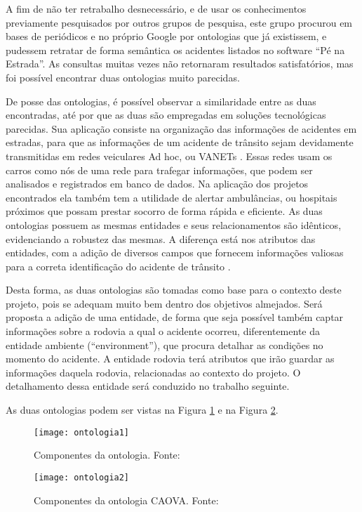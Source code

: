 
  A fim de não ter retrabalho desnecessário, e de usar os conhecimentos previamente
  pesquisados por outros grupos de pesquisa, este grupo procurou em bases de periódicos e no
  próprio Google por ontologias que já existissem, e pudessem retratar de forma semântica os
  acidentes listados no software “Pé na Estrada”. As consultas muitas vezes não retornaram
  resultados satisfatórios, mas foi possível encontrar duas ontologias muito parecidas.
  
  De posse das ontologias, é possível observar a similaridade entre as duas encontradas,
  até por que as duas são empregadas em soluções tecnológicas parecidas. Sua aplicação
  consiste na organização das informações de acidentes em estradas, para que as informações de
  um acidente de trânsito sejam devidamente transmitidas em redes veiculares Ad hoc, ou
  VANETs \cite{barrachina12}. Essas redes usam os carros como nós de uma rede para
  trafegar informações, que podem ser analisados e registrados em banco de dados. Na
  aplicação dos projetos encontrados ela também tem a utilidade de alertar ambulâncias, ou
  hospitais próximos que possam prestar socorro de forma rápida e eficiente. As duas
  ontologias possuem as mesmas entidades e seus relacionamentos são idênticos, evidenciando
  a robustez das mesmas. A diferença está nos atributos das entidades, com a adição de diversos
  campos que fornecem informações valiosas para a correta identificação do acidente de
  trânsito \cite{villalba14}.
  
  Desta forma, as duas ontologias são tomadas como base para o contexto deste projeto,
  pois se adequam muito bem dentro dos objetivos almejados. Será proposta a adição de uma
  entidade, de forma que seja possível também captar informações sobre a rodovia a qual o
  acidente ocorreu, diferentemente da entidade ambiente (“environment”), que procura detalhar
  as condições no momento do acidente. A entidade rodovia terá atributos que irão guardar as
  informações daquela rodovia, relacionadas ao contexto do projeto. O detalhamento dessa
  entidade será conduzido no trabalho seguinte.
  
  As duas ontologias podem ser vistas na Figura \ref{fig:ontologia1} e na Figura \ref{fig:ontologia2}.
  
  \begin{figure}[!htb]
    \centering
    \texttt{[image: ontologia1]}
    \caption[Componentes da ontologia]{Componentes da ontologia. Fonte: \cite{villalba14}}
    \label{fig:ontologia1}
  \end{figure}
  
    \begin{figure}[!htb]
    \centering
    \texttt{[image: ontologia2]}
    \caption[Componentes da ontologia CAOVA]{Componentes da ontologia CAOVA. Fonte: \cite{barrachina12}}
    \label{fig:ontologia2}
  \end{figure}
